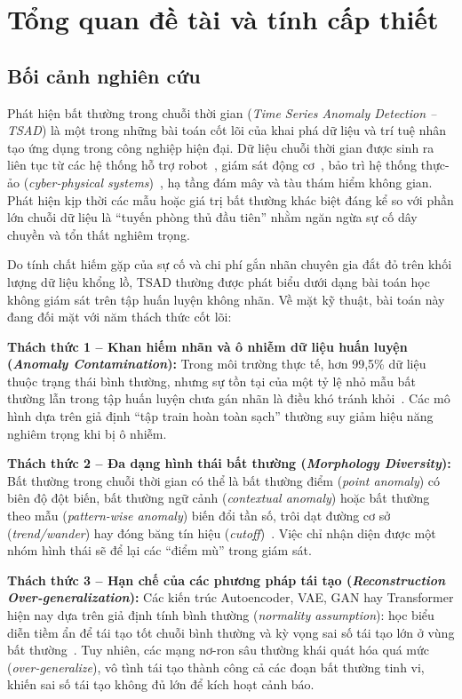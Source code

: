 \documentclass[sigconf,nonacm]{acmart}
\begin{document}
\section{Tổng quan đề tài và tính cấp thiết}

\subsection{Bối cảnh nghiên cứu}

Phát hiện bất thường trong chuỗi thời gian (\textit{Time Series Anomaly Detection -- TSAD}) là một trong những bài toán cốt lõi của khai phá dữ liệu và trí tuệ nhân tạo ứng dụng trong công nghiệp hiện đại. Dữ liệu chuỗi thời gian được sinh ra liên tục từ các hệ thống hỗ trợ robot~\cite{park2018}, giám sát động cơ~\cite{malhotra2016}, bảo trì hệ thống thực-ảo (\textit{cyber-physical systems})~\cite{tan2011}, hạ tầng đám mây và tàu thám hiểm không gian. Phát hiện kịp thời các mẫu hoặc giá trị bất thường khác biệt đáng kể so với phần lớn chuỗi dữ liệu là ``tuyến phòng thủ đầu tiên'' nhằm ngăn ngừa sự cố dây chuyền và tổn thất nghiêm trọng.

Do tính chất hiếm gặp của sự cố và chi phí gắn nhãn chuyên gia đắt đỏ trên khối lượng dữ liệu khổng lồ, TSAD thường được phát biểu dưới dạng bài toán học không giám sát trên tập huấn luyện không nhãn. Về mặt kỹ thuật, bài toán này đang đối mặt với năm thách thức cốt lõi:

\textbf{Thách thức 1 -- Khan hiếm nhãn và ô nhiễm dữ liệu huấn luyện (\textit{Anomaly Contamination}):} Trong môi trường thực tế, hơn 99,5\% dữ liệu thuộc trạng thái bình thường, nhưng sự tồn tại của một tỷ lệ nhỏ mẫu bất thường lẫn trong tập huấn luyện chưa gán nhãn là điều khó tránh khỏi~\cite{wu2022, xu2024}. Các mô hình dựa trên giả định ``tập train hoàn toàn sạch'' thường suy giảm hiệu năng nghiêm trọng khi bị ô nhiễm.

\textbf{Thách thức 2 -- Đa dạng hình thái bất thường (\textit{Morphology Diversity}):} Bất thường trong chuỗi thời gian có thể là bất thường điểm (\textit{point anomaly}) có biên độ đột biến, bất thường ngữ cảnh (\textit{contextual anomaly}) hoặc bất thường theo mẫu (\textit{pattern-wise anomaly}) biến đổi tần số, trôi dạt đường cơ sở (\textit{trend/wander}) hay đóng băng tín hiệu (\textit{cutoff})~\cite{blazquez2021, lai2021}. Việc chỉ nhận diện được một nhóm hình thái sẽ để lại các ``điểm mù'' trong giám sát.

\textbf{Thách thức 3 -- Hạn chế của các phương pháp tái tạo (\textit{Reconstruction Over-generalization}):} Các kiến trúc Autoencoder, VAE, GAN hay Transformer hiện nay dựa trên giả định tính bình thường (\textit{normality assumption}): học biểu diễn tiềm ẩn để tái tạo tốt chuỗi bình thường và kỳ vọng sai số tái tạo lớn ở vùng bất thường~\cite{zhou2019, xu2022, tuli2022}. Tuy nhiên, các mạng nơ-ron sâu thường khái quát hóa quá mức (\textit{over-generalize}), vô tình tái tạo thành công cả các đoạn bất thường tinh vi, khiến sai số tái tạo không đủ lớn để kích hoạt cảnh báo.
\end{document}
